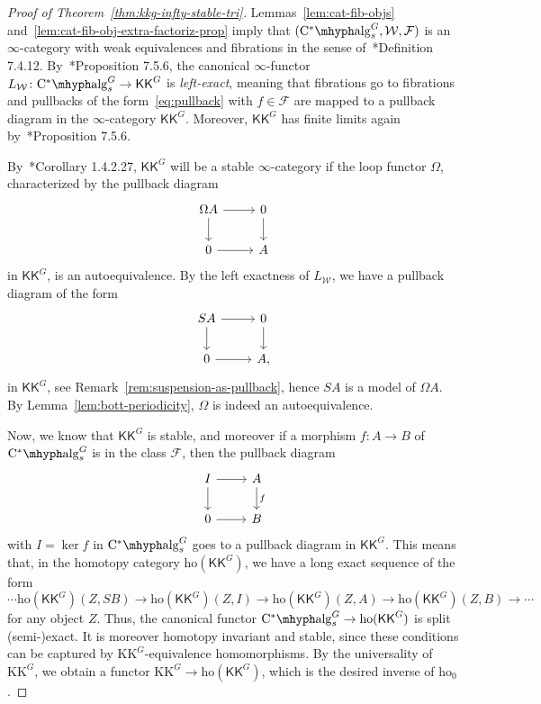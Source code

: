 \documentclass[a4paper,reqno]{amsart}
\theoremstyle{plain}
\theoremstyle{definition}
\theoremstyle{remark}
\numberwithin{equation}{section}
\newcommand{\cF}{\mathcal{F}}
\newcommand{\cW}{\mathcal{W}}
\newcommand{\CstAlg}{\mathrm{C}^*\mhyph\mathrm{alg}}
\newcommand{\ho}{\mathrm{ho}}
\newcommand{\KK}{\mathrm{KK}}
\newcommand{\icKK}{\mathsf{KK}}
\begin{document}
\begin{proof}[Proof of Theorem~\ref{thm:kkg-infty-stable-tri}]
Lemmas~\ref{lem:cat-fib-objs} and~\ref{lem:cat-fib-obj-extra-factoriz-prop} imply that $(\CstAlg_s^G, \cW, \cF)$ is an $\infty$-category with weak equivalences and fibrations in the sense of~\cite{cis:ha}*{Definition 7.4.12}.
By~\cite{cis:ha}*{Proposition 7.5.6}, the canonical $\infty$-functor $L_\cW \colon \CstAlg_s^G \to \icKK^G$ is \emph{left-exact}, meaning that fibrations go to fibrations and pullbacks of the form~\eqref{eq:pullback} with $f \in \cF$ are mapped to a pullback diagram in the $\infty$-category $\icKK^G$.
Moreover, $\icKK^G$ has finite limits again by~\cite{cis:ha}*{Proposition 7.5.6}.

By~\cite{lur:ha}*{Corollary 1.4.2.27}, $\icKK^G$ will be a stable $\infty$-category if the loop functor $\Omega$, characterized by the pullback diagram
\[
\begin{tikzcd}
  \Omega A \arrow[r] \arrow[d] & 0 \arrow[d] \\
  0 \arrow[r] & A
\end{tikzcd}
\]
in $\icKK^G$, is an autoequivalence.
By the left exactness of $L_\cW$, we have a pullback diagram of the form
\[
\begin{tikzcd}
S A \arrow[r] \arrow[d] & 0 \arrow[d] \\
0 \arrow[r] & A,
\end{tikzcd}
\]
in $\icKK^G$, see Remark~\ref{rem:suspension-as-pullback}, hence $S A$ is a model of $\Omega A$.
By Lemma~\ref{lem:bott-periodicity}, $\Omega$ is indeed an autoequivalence.

Now, we know that $\icKK^G$ is stable, and moreover if a morphism $f \colon A \to B$ of $\CstAlg_s^G$ is in the class $\cF$, then the pullback diagram
\[
\begin{tikzcd}
  I \arrow[r] \arrow[d] & A \arrow[d, "f"] \\
  0 \arrow[r] & B
\end{tikzcd}
\]
with $I = \ker f$ in $\CstAlg_s^G$ goes to a pullback diagram in $\icKK^G$.
This means that, in the homotopy category $\ho(\icKK^G)$, we have a long exact sequence of the form
\[
\cdots \ho(\icKK^G)(Z, S B) \to \ho(\icKK^G)(Z, I) \to \ho(\icKK^G)(Z, A) \to \ho(\icKK^G)(Z, B) \to \cdots
\]
for any object $Z$.
Thus, the canonical functor $\CstAlg_s^G \to \ho(\icKK^G)$ is split (semi-)exact.
It is moreover homotopy invariant and stable, since these conditions can be captured by $\KK^G$-equivalence homomorphisms.
By the universality of $\KK^G$, we obtain a functor $\KK^G \to \ho(\icKK^G)$, which is the desired inverse of $\ho_0$.


\end{proof}
\end{document}
